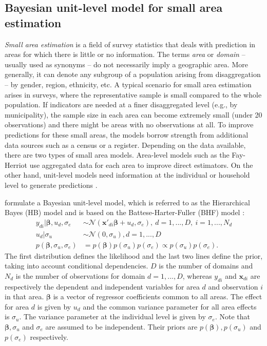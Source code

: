 \subsection{Bayesian unit-level model for small area estimation}

\textit{Small area estimation} is a field of survey statistics that deals with prediction in areas for which there is little or no information.
The terms \textit{area} or \textit{domain} – usually used as synonyms – do not necessarily imply a geographic area.
More generally, it can denote any subgroup of a population arising from disaggregation – by gender, region, ethnicity, etc.
A typical scenario for small area estimation arises in surveys, where the representative sample is small compared to the whole population.
If indicators are needed at a finer disaggregated level (e.g., by municipality), the sample size in each area can become extremely small (under 20 observations) and there might be areas with no observations at all.
To improve predictions for these small areas, the models borrow strength from additional data sources such as a census or a register.
Depending on the data available, there are two types of small area models.
Area-level models such as the Fay-Herriot use aggregated data for each area to improve direct estimators.
On the other hand, unit-level models need information at the individual or household level to generate predictions \citep[Chapter 1 and 2]{rao_small_2015}.

\cite{molina_small_2014} formulate a Bayesian unit-level model, which is referred to as the Hierarchical Bayes (HB) model and is based on the Battese-Harter-Fuller (BHF) model \citep{battese_error_1988}:
\begin{equation}
    \label{eq:hb_rao}
	\begin{split}
	y_{di} |\boldsymbol \beta, u_d, \sigma_e & \sim \mathcal N(\boldsymbol{x'}_{di} \boldsymbol{\beta}+ u_d, \sigma_e), ~ d = 1, ..., D, ~ i = 1, ..., N_d \\
	u_d | \sigma_u & \sim \mathcal N(0, \sigma_u), d = 1, ..., D \\
	p(\boldsymbol \beta, \sigma_u, \sigma_e) & = p(\boldsymbol \beta) p(\sigma_u)p(\sigma_e) \propto p(\sigma_u)p(\sigma_e).
	\end{split}
\end{equation}
The first distribution defines the likelihood and the last two lines define the prior, taking into account conditional dependencies.
$D$ is the number of domains and $N_d$ is the number of observations for domain $d = 1, ..., D$, whereas $y_{di}$ and $\boldsymbol{x}_{di}$ are respectively the dependent and independent variables for area $d$ and observation $i$ in that area.
$\boldsymbol \beta$ is a vector of regressor coefficients common to all areas.
The effect for area $d$ is given by $u_d$ and the common variance parameter for all area effects is $\sigma_u$.
The variance parameter at the individual level is given by $\sigma_e$.
Note that $\boldsymbol \beta, \sigma_u$ and $\sigma_e$ are assumed to be independent.
Their priors are $p(\boldsymbol \beta), p(\sigma_u)$ and $p(\sigma_e)$ respectively.

